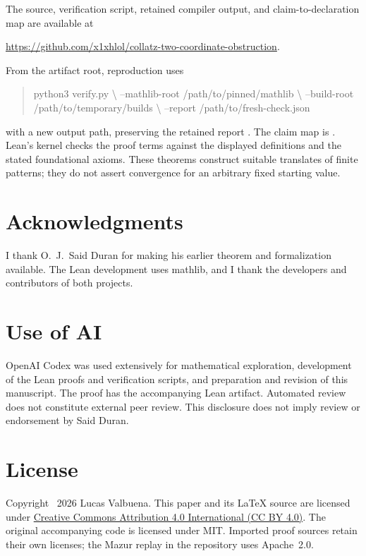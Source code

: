 \documentclass[11pt,a4paper]{article}
\begin{document}
The source, verification script, retained compiler output, and
claim-to-declaration map are available at
\begin{center}\small
\url{https://github.com/x1xhlol/collatz-two-coordinate-obstruction}.
\end{center}
From the artifact root, reproduction uses
\begin{quote}\small\ttfamily
python3 verify.py \textbackslash\newline
\hspace*{1em}--mathlib-root /path/to/pinned/mathlib \textbackslash\newline
\hspace*{1em}--build-root /path/to/temporary/builds \textbackslash\newline
\hspace*{1em}--report /path/to/fresh-check.json
\end{quote}
with a new output path, preserving the retained report
. The claim map is
. Lean's kernel checks the proof terms against
the displayed definitions and the stated foundational axioms.
These theorems construct suitable translates of finite patterns; they
do not assert convergence for an arbitrary fixed starting value.

\section*{Acknowledgments}
I thank O.\ J.\ Said Duran for making his earlier theorem and
formalization available. The Lean development uses mathlib, and I thank
the developers and contributors of both projects.

\section*{Use of AI}
OpenAI Codex was used extensively for mathematical exploration,
development of the Lean proofs and verification scripts, and preparation
and revision of this manuscript. The proof has the accompanying Lean
artifact. Automated review does not constitute external peer review.
This disclosure does not imply review or endorsement by Said Duran.

\section*{License}
Copyright \textcopyright\ 2026 Lucas Valbuena.
This paper and its LaTeX source are licensed under
\href{https://creativecommons.org/licenses/by/4.0/}{Creative Commons
Attribution 4.0 International (CC BY 4.0)}. The original accompanying
code is licensed under MIT. Imported proof sources retain their own
licenses; the Mazur replay in the repository uses Apache~2.0.
\end{document}
